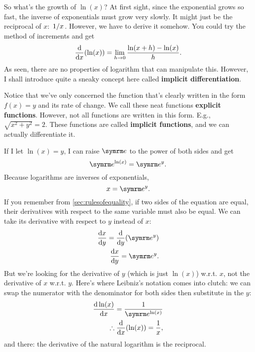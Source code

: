 So what's the growth of $\ln(x)$? At first sight, since the exponential grows so fast, the inverse of exponentials must grow very slowly. It might just be the reciprocal of $x$: $\flatfrac{1}{x}$. However, we have to derive it somehow. You could try the method of increments and get
\begin{equation}
    \dv{x}(\ln(x)) = \lim_{h \rightarrow 0}\frac{\ln(x + h) - \ln(x)}{h}.
\end{equation}
As seen, there are no properties of logarithm that can manipulate this. However, I shall introduce quite a sneaky concept here called \textbf{implicit differentiation}.

Notice that we've only concerned the function that's clearly written in the form $f(x) = y$ and its rate of change. We call these neat functions \textbf{explicit functions}. However, not all functions are written in this form. E.g., $\sqrt{x^2 + y^2} = 2$. These functions are called \textbf{implicit functions}, and we can actually differentiate it.

If I let $\ln(x) = y$, I can raise $\e$ to the power of both sides and get
\begin{equation}
    \e^{\ln(x)} = \e^y.
\end{equation}
Because logarithms are inverses of exponentials,
\begin{equation}
    x = \e^y.
\end{equation}
If you remember from \cref{sec:rulesofequality}, if two sides of the equation are equal, their derivatives with respect to the same variable must also be equal. We can take its derivative with respect to $y$ instead of $x$:
\begin{align*}
    \dv{x}{y} = \dv{y}(\e^y) \\
    \dv{x}{y} = \e^y.
\end{align*}
But we're looking for the derivative of $y$ (which is just $\ln(x)$) w.r.t. $x$, not the derivative of $x$ w.r.t. $y$. Here's where Leibniz's notation comes into clutch: we can swap the numerator with the denominator for both sides then substitute in the $y$:
\begin{align*}
    \dv{\ln(x)}{x} = \frac{1}{\e^{\ln(x)}} \\
    \therefore\dv{x}(\ln(x)) = \frac{1}{x},
\end{align*}
and there: the derivative of the natural logarithm is the reciprocal.

